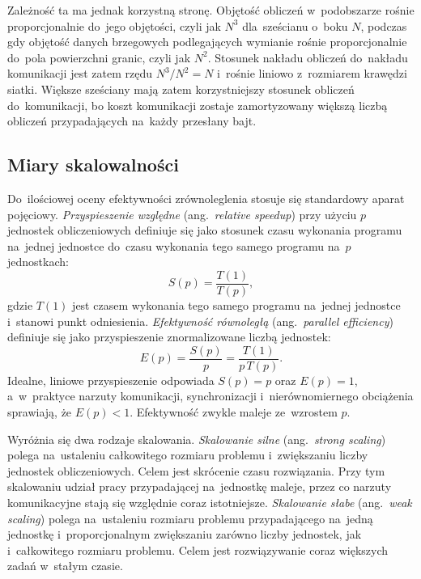 Zależność ta ma jednak korzystną stronę. Objętość
obliczeń w~podobszarze rośnie proporcjonalnie do~jego objętości, czyli jak
\(N^3\) dla~sześcianu o~boku \(N\), podczas gdy objętość danych brzegowych
podlegających wymianie rośnie proporcjonalnie do~pola powierzchni granic,
czyli jak \(N^2\). Stosunek nakładu obliczeń do~nakładu komunikacji jest zatem
rzędu \(N^3/N^2 = N\) i~rośnie liniowo z~rozmiarem krawędzi siatki. Większe
sześciany mają zatem korzystniejszy stosunek obliczeń do~komunikacji, bo
koszt komunikacji zostaje zamortyzowany większą liczbą obliczeń przypadających
na~każdy przesłany bajt.

\subsection{Miary skalowalności}

Do~ilościowej oceny efektywności zrównoleglenia stosuje się standardowy aparat
pojęciowy. \emph{Przyspieszenie względne} (ang.\ \emph{relative speedup}) przy użyciu \(p\)
jednostek obliczeniowych definiuje się jako stosunek czasu wykonania programu na~jednej
jednostce do~czasu wykonania tego samego programu na~\(p\) jednostkach:
\begin{equation}
  S(p) = \frac{T(1)}{T(p)},
  \label{eq:speedup}
\end{equation}
gdzie \(T(1)\) jest czasem wykonania tego samego programu na~jednej jednostce i~stanowi
punkt odniesienia. \emph{Efektywność równoległą} (ang.\ \emph{parallel efficiency}) definiuje się jako
przyspieszenie znormalizowane liczbą jednostek:
\begin{equation}
  E(p) = \frac{S(p)}{p} = \frac{T(1)}{p\,T(p)}.
  \label{eq:efficiency}
\end{equation}
Idealne, liniowe przyspieszenie odpowiada \(S(p)=p\) oraz \(E(p)=1\), a~w~praktyce
narzuty komunikacji, synchronizacji i~nierównomiernego obciążenia sprawiają,
że \(E(p)<1\). Efektywność zwykle maleje ze~wzrostem \(p\).

Wyróżnia się dwa rodzaje skalowania. \emph{Skalowanie silne}
(ang.\ \emph{strong scaling}) polega na~ustaleniu całkowitego rozmiaru problemu
i~zwiększaniu liczby jednostek obliczeniowych. Celem jest skrócenie czasu
rozwiązania. Przy tym skalowaniu udział pracy przypadającej na~jednostkę maleje,
przez co narzuty komunikacyjne stają się względnie coraz istotniejsze.
\emph{Skalowanie słabe}
(ang.\ \emph{weak scaling}) polega na~ustaleniu rozmiaru problemu przypadającego
na~jedną jednostkę i~proporcjonalnym zwiększaniu zarówno liczby jednostek, jak
i~całkowitego rozmiaru problemu. Celem jest rozwiązywanie coraz większych
zadań w~stałym czasie.


